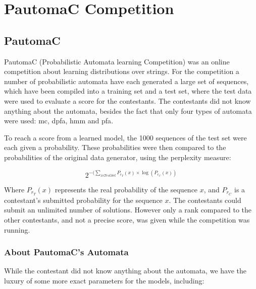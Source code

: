 \section{PautomaC Competition}
\label{sec:pautomac}
\subsection{PautomaC}
PautomaC (Probabilistic Automata learning Competition) was an online competition about learning distributions over strings. For the competition a number of probabilistic automata have each generated a large set of sequences, which have been compiled into a training set and a test set, where the test data were used to evaluate a score for the contestants.
The contestants did not know anything about the automata, besides the fact that only four types of automata were used: \gls{mc}, \gls{dpfa}, \gls{hmm} and \gls{pfa}.

To reach a score from a learned model, the 1000 sequences of the test set were each given a probability. These probabilities were then compared to the probabilities of the original data generator, using the perplexity measure:

\begin{equation} \label{eq:perplexity}
2^{-(\sum_{x\epsilon TestSet}P_{r_{T}}(x)\times\log(P_{r_{C}}(x))}
\end{equation}

Where $P_{r_{T}}(x)$ represents the real probability of the
sequence $x$, and $P_{r_{C}}$ is a contestant's submitted probability for the sequence $x$.
The contestants could submit an unlimited number of solutions. However only a rank compared to the other contestants, and not a precise score, was given while the competition was running.

\subsubsection{About PautomaC's Automata}
While the contestant did not know anything about the automata, we have the luxury of some more exact parameters for the models, including:

